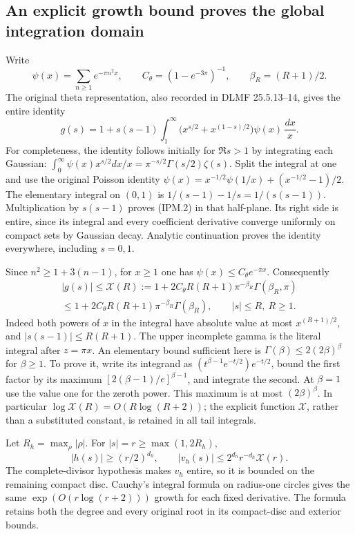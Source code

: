 \documentclass[11pt,a4paper]{article}
\begin{document}
\subsection{An explicit growth bound proves the global integration domain}

Write
\[
 \psi(x)=\sum_{n\ge1}e^{-\pi n^2x},\qquad
 C_\theta=(1-e^{-3\pi})^{-1},\qquad
 \beta_R=(R+1)/2.
 \tag{IPM.1}
\]
The original theta representation, also recorded in DLMF 25.5.13--14,
gives the entire identity
\[
 g(s)=1+s(s-1)\int_1^\infty
       \bigl(x^{s/2}+x^{(1-s)/2}\bigr)\psi(x)\,\frac{dx}{x}.
 \tag{IPM.2}
\]
For completeness, the identity follows initially for \(\Re s>1\)
by integrating each Gaussian:
\(\int_0^\infty\psi(x)x^{s/2}dx/x
=\pi^{-s/2}\Gamma(s/2)\zeta(s)\).
Split the integral at one and use the original Poisson identity
\(\psi(x)=x^{-1/2}\psi(1/x)+(x^{-1/2}-1)/2\).
The elementary integral on \((0,1)\) is
\(1/(s-1)-1/s=1/(s(s-1))\). Multiplication by \(s(s-1)\)
proves (IPM.2) in that half-plane. Its right side is entire, since its
integral and every coefficient derivative converge uniformly on compact
sets by Gaussian decay. Analytic continuation proves the identity
everywhere, including \(s=0,1\).

Since \(n^2\ge1+3(n-1)\), for \(x\ge1\)
one has \(\psi(x)\le C_\theta e^{-\pi x}\). Consequently
\[
 \begin{gathered}
 |g(s)|\le\mathcal X(R):=
  1+2C_\theta R(R+1)\pi^{-\beta_R}\Gamma(\beta_R,\pi)\\
 \le 1+2C_\theta R(R+1)\pi^{-\beta_R}\Gamma(\beta_R),
 \qquad |s|\le R,\ R\ge1.
 \end{gathered}
 \tag{IPM.3}
\]
Indeed both powers of \(x\) in the integral have absolute value at most
\(x^{(R+1)/2}\), and \(|s(s-1)|\le R(R+1)\).
The upper incomplete gamma is the literal integral after \(z=\pi x\).
An elementary bound sufficient here is
\(\Gamma(\beta)\le2(2\beta)^\beta\) for \(\beta\ge1\).
To prove it, write its integrand as
\((t^{\beta-1}e^{-t/2})e^{-t/2}\), bound the first factor by
its maximum \([2(\beta-1)/e]^{\beta-1}\), and integrate the second.
At \(\beta=1\) use the value one for the zeroth power. This maximum
is at most \((2\beta)^\beta\). In particular
\(\log\mathcal X(R)=O(R\log(R+2))\); the explicit function
\(\mathcal X\), rather than a substituted constant, is retained in
all tail integrals.

Let \(R_h=\max_\rho|\rho|\). For \(|s|=r\ge\max(1,2R_h)\),
\[
 |h(s)|\ge(r/2)^{d_h},\qquad
 |v_h(s)|\le 2^{d_h}r^{-d_h}\mathcal X(r).
 \tag{IPM.4}
\]
The complete-divisor hypothesis makes \(v_h\) entire, so it is bounded
on the remaining compact disc. Cauchy's integral formula on radius-one
circles gives the same \(\exp(O(r\log(r+2)))\) growth for each fixed
derivative. The formula retains both the degree and every original root
in its compact-disc and exterior bounds.
\end{document}
